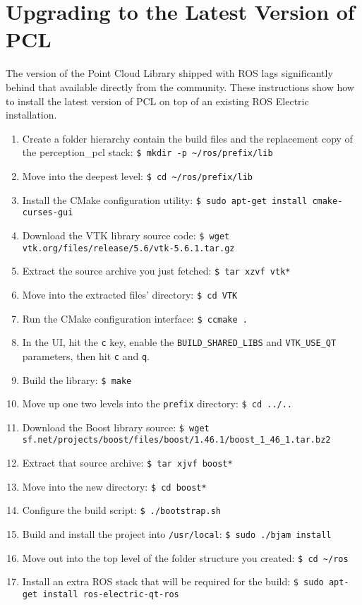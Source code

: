 \documentclass[12pt]{report}
\begin{document}
\section{Upgrading to the Latest Version of PCL}
The version of the Point Cloud Library shipped with ROS lags significantly behind that available directly from the community.  These instructions show how to install the latest version of PCL on top of an existing ROS Electric installation.
\begin{enumerate}
\item{Create a folder hierarchy contain the build files and the replacement copy of the perception\_pcl stack: \texttt{\$\ mkdir -p \~{}/ros/prefix/lib}}
\item{Move into the deepest level: \texttt{\$\ cd \~{}/ros/prefix/lib}}
\item{Install the CMake configuration utility: \texttt{\$\ sudo apt-get install cmake-curses-gui}}
\item{Download the VTK library source code: \texttt{\$\ wget vtk.org/files/release/5.6/vtk-5.6.1.tar.gz}}
\item{Extract the source archive you just fetched: \texttt{\$\ tar xzvf vtk*}}
\item{Move into the extracted files' directory: \texttt{\$\ cd VTK}}
\item{Run the CMake configuration interface: \texttt{\$\ ccmake .}}
\item{In the UI, hit the \texttt{c} key, enable the \texttt{BUILD\_SHARED\_LIBS} and \texttt{VTK\_USE\_QT} parameters, then hit \texttt{c} and \texttt{q}.}
\item{Build the library: \texttt{\$\ make}}
\item{Move up one two levels into the \texttt{prefix} directory: \texttt{\$\ cd ../..}}
\item{Download the Boost library source: \texttt{\$\ wget sf.net/projects/boost/files/boost/1.46.1/boost\_1\_46\_1.tar.bz2}}
\item{Extract that source archive: \texttt{\$\ tar xjvf boost*}}
\item{Move into the new directory: \texttt{\$\ cd boost*}}
\item{Configure the build script: \texttt{\$\ ./bootstrap.sh}}
\item{Build and install the project into \texttt{/usr/local}: \texttt{\$\ sudo ./bjam install}}
\item{Move out into the top level of the folder structure you created: \texttt{\$\ cd \~{}/ros}}
\item{Install an extra ROS stack that will be required for the build: \texttt{\$\ sudo apt-get install ros-electric-qt-ros}}

\end{enumerate}
\end{document}
